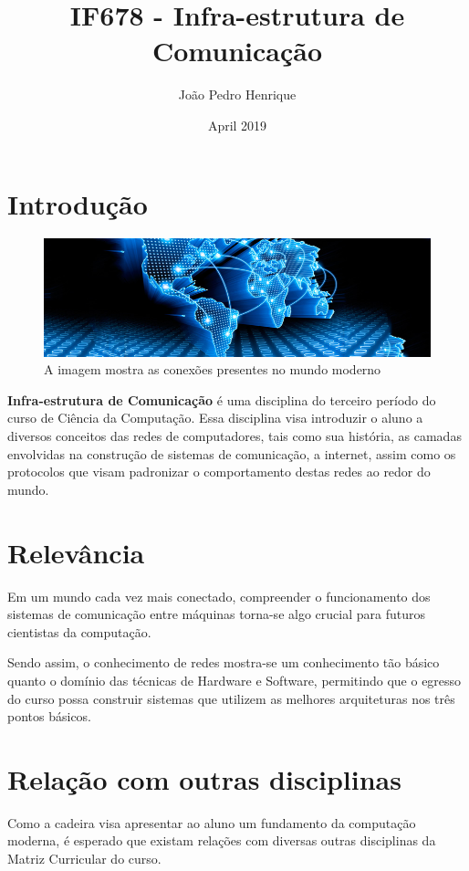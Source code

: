 \documentclass{article}
\title{IF678 - Infra-estrutura de Comunicação}
\author{João Pedro Henrique}
\date{April 2019}
\begin{document}
\maketitle

\section{Introdução}
\begin{figure}[H]
    \centering
    \includegraphics[scale=0.42]{redes.jpg}
    \caption{A imagem \cite{imagem} mostra as conexões presentes no mundo moderno}
\end{figure}

\textbf{Infra-estrutura de Comunicação} é uma disciplina do terceiro período do curso de Ciência da Computação. Essa disciplina visa introduzir o aluno a diversos conceitos das redes de computadores, tais como sua história, as camadas envolvidas na construção de sistemas de comunicação, a internet, assim como os protocolos que visam padronizar o comportamento destas redes ao redor do mundo.

\section{Relevância}
Em um mundo cada vez mais conectado, compreender o funcionamento dos sistemas de comunicação entre máquinas torna-se algo crucial para futuros cientistas da computação.

Sendo assim, o conhecimento de redes mostra-se um conhecimento tão básico quanto o domínio das técnicas de Hardware e Software, permitindo que o egresso do curso possa construir sistemas que utilizem as melhores arquiteturas nos três pontos básicos.

\section{Relação com outras disciplinas}

Como a cadeira visa apresentar ao aluno um fundamento da computação moderna, é esperado que existam relações com diversas outras disciplinas da Matriz Curricular do curso.
\end{document}
